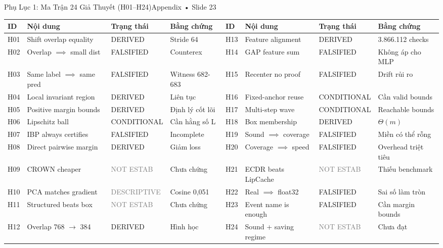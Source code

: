 \documentclass[aspectratio=169, 10pt]{beamer}
\begin{document}
\begin{frame}{Phụ Lục 1: Ma Trận 24 Giả Thuyết (H01–H24)}{Appendix • Slide 23}
    \tiny
    \begin{tabular}{llll|llll}
        \toprule
        \textbf{ID} & \textbf{Nội dung} & \textbf{Trạng thái} & \textbf{Bằng chứng} & \textbf{ID} & \textbf{Nội dung} & \textbf{Trạng thái} & \textbf{Bằng chứng} \\
        \midrule
        H01 & Shift overlap equality & \textcolor{MintGreen}{DERIVED} & Stride 64 & H13 & Feature alignment & \textcolor{MintGreen}{DERIVED} & 3.866.112 checks \\
        H02 & Overlap $\implies$ small dist & \textcolor{AlertRed}{FALSIFIED} & Counterex & H14 & GAP feature sum & \textcolor{AlertRed}{FALSIFIED} & Không áp cho MLP \\
        H03 & Same label $\implies$ same pred & \textcolor{AlertRed}{FALSIFIED} & Witness 682-683 & H15 & Recenter no proof & \textcolor{AlertRed}{FALSIFIED} & Drift rủi ro \\
        H04 & Local invariant region & \textcolor{MintGreen}{DERIVED} & Liên tục & H16 & Fixed-anchor reuse & \textcolor{WarnAmber}{CONDITIONAL} & Cần valid bounds \\
        H05 & Positive margin bounds & \textcolor{MintGreen}{DERIVED} & Định lý cốt lõi & H17 & Multi-step wave & \textcolor{WarnAmber}{CONDITIONAL} & Reachable bounds \\
        H06 & Lipschitz ball & \textcolor{WarnAmber}{CONDITIONAL} & Cần hằng số L & H18 & Box membership & \textcolor{MintGreen}{DERIVED} & $\Theta(m)$ \\
        H07 & IBP always certifies & \textcolor{AlertRed}{FALSIFIED} & Incomplete & H19 & Sound $\implies$ coverage & \textcolor{AlertRed}{FALSIFIED} & Miền có thể rỗng \\
        H08 & Direct pairwise margin & \textcolor{MintGreen}{DERIVED} & Giảm loss & H20 & Coverage $\implies$ speed & \textcolor{AlertRed}{FALSIFIED} & Overhead triệt tiêu \\
        H09 & CROWN cheaper & \textcolor{gray}{NOT ESTAB} & Chưa chứng & H21 & ECDR beats LipCache & \textcolor{gray}{NOT ESTAB} & Thiếu benchmark \\
        H10 & PCA matches gradient & \textcolor{gray}{DESCRIPTIVE} & Cosine 0,051 & H22 & Real $\implies$ float32 & \textcolor{AlertRed}{FALSIFIED} & Sai số làm tròn \\
        H11 & Structured beats box & \textcolor{gray}{NOT ESTAB} & Chưa chứng & H23 & Event name is enough & \textcolor{AlertRed}{FALSIFIED} & Cần margin bounds \\
        H12 & Overlap 768 $\to$ 384 & \textcolor{MintGreen}{DERIVED} & Hình học & H24 & Sound + saving regime & \textcolor{gray}{NOT ESTAB} & Chưa đạt \\
        \bottomrule
    \end{tabular}
\end{frame}
\end{document}
